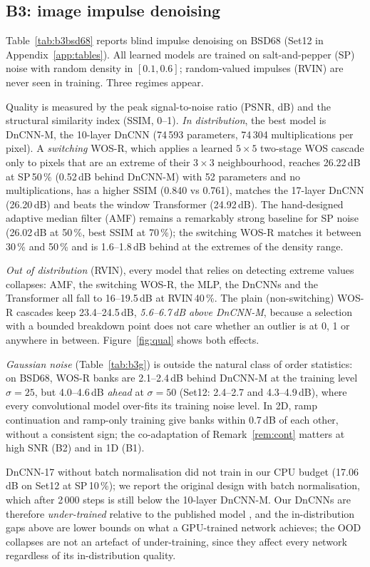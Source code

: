 \documentclass[11pt,a4paper]{article}
\theoremstyle{definition}
\theoremstyle{remark}
\begin{document}


\subsection{B3: image impulse denoising}
Table~\ref{tab:b3bsd68} reports blind impulse denoising on BSD68 (Set12 in Appendix~\ref{app:tables}). All learned models are
trained on salt-and-pepper (SP) noise with random density in $[0.1,0.6]$; random-valued impulses (RVIN) are never seen
in training. Three regimes appear.

Quality is measured by the peak signal-to-noise ratio (PSNR, dB) and the structural similarity index (SSIM, 0--1).
\emph{In distribution}, the best model is DnCNN-M, the 10-layer DnCNN (74\,593 parameters, 74\,304 multiplications per pixel). A
\emph{switching} WOS-R, which applies a learned $5{\times}5$ two-stage WOS cascade only to pixels that are an extreme of
their $3{\times}3$ neighbourhood, reaches 26.22\,dB at SP\,50\,\% (0.52\,dB behind DnCNN-M) with 52 parameters and no
multiplications, has a higher SSIM (0.840 vs 0.761), matches the 17-layer DnCNN (26.20\,dB) and beats the window
Transformer (24.92\,dB). The hand-designed adaptive median filter (AMF) remains a remarkably strong baseline for SP noise
(26.02\,dB at 50\,\%, best SSIM at 70\,\%); the switching WOS-R matches it between 30\,\% and 50\,\% and is 1.6--1.8\,dB
behind at the extremes of the density range.

\emph{Out of distribution} (RVIN), every model that relies on detecting extreme values collapses: AMF, the switching
WOS-R, the MLP, the DnCNNs and the Transformer all fall to 16--19.5\,dB at RVIN\,40\,\%. The plain (non-switching) WOS-R
cascades keep 23.4--24.5\,dB, \emph{5.6--6.7\,dB above DnCNN-M}, because a selection with a bounded breakdown point does not
care whether an outlier is at 0, 1 or anywhere in between. Figure~\ref{fig:qual} shows both effects.

\emph{Gaussian noise} (Table~\ref{tab:b3g}) is outside the natural class of order statistics: on BSD68, WOS-R banks are 2.1--2.4\,dB
behind DnCNN-M at the training level $\sigma=25$, but 4.0--4.6\,dB \emph{ahead} at $\sigma=50$ (Set12: 2.4--2.7 and 4.3--4.9\,dB), where every convolutional
model over-fits its training noise level. In 2D, ramp continuation and ramp-only training give banks within 0.7\,dB of each
other, without a consistent sign; the co-adaptation of Remark~\ref{rem:cont} matters at high SNR (B2) and in 1D (B1).

DnCNN-17 without batch normalisation did not train in our CPU budget (17.06\,dB on Set12 at SP\,10\,\%); we report the
original design with batch normalisation, which after 2\,000 steps is still below the 10-layer DnCNN-M. Our DnCNNs are
therefore \emph{under-trained} relative to the published model \cite{zhang2017dncnn}, and the in-distribution gaps above
are lower bounds on what a GPU-trained network achieves; the OOD collapses are not an artefact of under-training, since
they affect every network regardless of its in-distribution quality.
\end{document}
